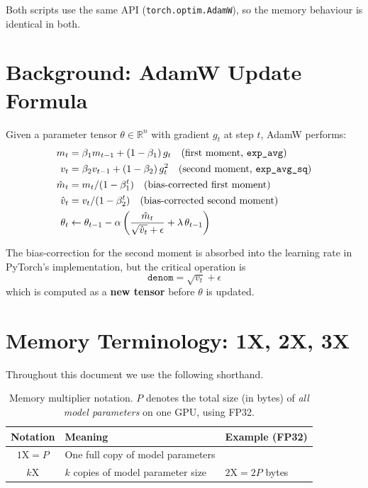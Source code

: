 \documentclass[11pt,a4paper]{article}
\begin{document}
Both scripts use the same API (\texttt{torch.optim.AdamW}), so the memory
behaviour is identical in both.

\section{Background: AdamW Update Formula}
\label{sec:formula}

Given a parameter tensor $\theta \in \mathbb{R}^n$ with gradient $g_t$ at
step $t$, AdamW performs:
\begin{align}
  m_t &= \beta_1 m_{t-1} + (1 - \beta_1)\, g_t
        \quad\text{(first moment, \texttt{exp\_avg})} \label{eq:m} \\
  v_t &= \beta_2 v_{t-1} + (1 - \beta_2)\, g_t^2
        \quad\text{(second moment, \texttt{exp\_avg\_sq})} \label{eq:v} \\
  \hat{m}_t &= m_t / (1 - \beta_1^t)
        \quad\text{(bias-corrected first moment)} \label{eq:mhat} \\
  \hat{v}_t &= v_t / (1 - \beta_2^t)
        \quad\text{(bias-corrected second moment)} \label{eq:vhat} \\
  \theta_t &\leftarrow \theta_{t-1}
            - \alpha \left(\frac{\hat{m}_t}{\sqrt{\hat{v}_t} + \epsilon}
            + \lambda\,\theta_{t-1}\right) \label{eq:update}
\end{align}

The bias-correction for the second moment is absorbed into the learning
rate in PyTorch's implementation, but the critical operation is
\begin{equation}
  \mathtt{denom} = \sqrt{v_t} + \epsilon
  \label{eq:denom}
\end{equation}
which is computed as a \textbf{new tensor} before $\theta$ is updated.

\section{Memory Terminology: 1X, 2X, 3X}
\label{sec:terminology}

Throughout this document we use the following shorthand.

\begin{table}[h]
\centering
\caption{Memory multiplier notation. $P$ denotes the total size (in bytes)
of \emph{all model parameters} on one GPU, using FP32.}
\label{tab:notation}
\begin{tabular}{cll}
\toprule
\textbf{Notation} & \textbf{Meaning} & \textbf{Example (FP32)} \\
\midrule
$1\mathrm{X} = P$   & One full copy of model parameters & \\
$k\mathrm{X}$        & $k$ copies of model parameter size
                     & $2\mathrm{X} = 2P$ bytes \\
\bottomrule
\end{tabular}
\end{table}
\end{document}

